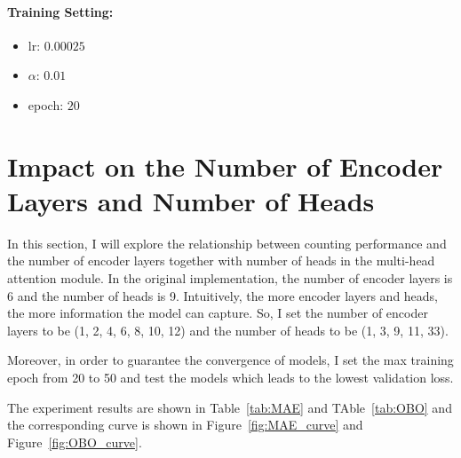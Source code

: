 \documentclass[10pt,twocolumn,letterpaper]{article}
\begin{document}
    \paragraph{Training Setting:}
    \begin{itemize}
        \item lr: $0.00025$
        \item $\alpha$: $0.01$
        \item epoch: $20$
    \end{itemize}



    \section{Impact on the Number of Encoder Layers and Number of Heads}
    \label{sec:num_layers_num_heads}
    In this section, I will explore the relationship between counting performance and the number of encoder layers
    together with number of heads in the multi-head attention module.
    In the original implementation, the number of encoder layers is 6 and the number of heads is 9.
    Intuitively, the more encoder layers and heads, the more information the model can capture.
    So, I set the number of encoder layers to be (1, 2, 4, 6, 8, 10, 12) and the number of heads to be (1, 3, 9, 11, 33).

    Moreover, in order to guarantee the convergence of models, I set the max training epoch from 20 to 50 and test the models
    which leads to the lowest validation loss.

    The experiment results are shown in Table~\ref{tab:MAE} and TAble~\ref{tab:OBO} and the corresponding curve is shown in Figure~\ref{fig:MAE_curve} and Figure~\ref{fig:OBO_curve}.
    
\end{document}

